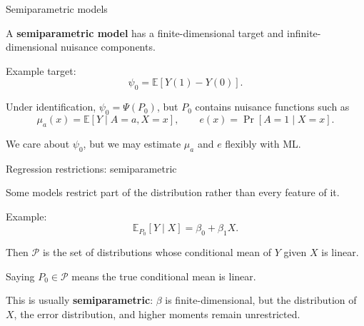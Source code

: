 \documentclass[xcolor={table}, handout]{beamer}
\begin{document}
\note{
\scriptsize \singlespacing

}
\begin{frame}{Semiparametric models}

\begin{wideitemize}
\item A \textbf{semiparametric model} has a finite-dimensional target and infinite-dimensional nuisance components.\pause
\item Example target:
\[
\psi_0=\mathbb{E}[Y(1)-Y(0)].
\]\pause
\item Under identification, $\psi_0=\Psi(P_0)$, but $P_0$ contains nuisance functions such as
\[
\mu_a(x)=\mathbb{E}[Y\mid A=a,X=x],
\qquad
e(x)=\Pr[A=1\mid X=x].
\]\pause
\item We care about $\psi_0$, but we may estimate $\mu_a$ and $e$ flexibly with ML.
\end{wideitemize}

\end{frame}

\note{
\scriptsize \singlespacing

}
\begin{frame}{Regression restrictions: semiparametric}

\begin{wideitemize}
\item Some models restrict part of the distribution rather than every feature of it.\pause
\item Example:
\[
\mathbb{E}_{P_0}[Y\mid X]=\beta_0+\beta_1X.
\]\pause
\item Then $\mathcal{P}$ is the set of distributions whose conditional mean of $Y$ given $X$ is linear.\pause
\item Saying $P_0\in\mathcal{P}$ means the true conditional mean is linear.\pause
\item This is usually \textbf{semiparametric}: $\beta$ is finite-dimensional, but the distribution of $X$, the error distribution, and higher moments remain unrestricted.
\end{wideitemize}

\end{frame}
\end{document}
